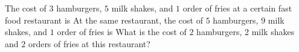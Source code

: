The cost of $3$ hamburgers, $5$ milk shakes, and $1$ order of fries at a certain fast food restaurant is  At the same restaurant, the cost of $5$ hamburgers, $9$ milk shakes, and $1$ order of fries is  What is the cost of $2$ hamburgers, $2$ milk shakes and $2$ orders of fries at this restaurant?